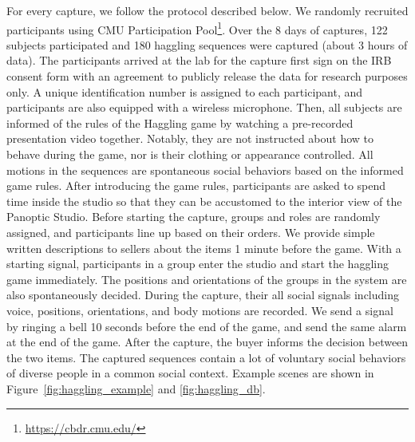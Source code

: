 For every capture, we follow the protocol described below. We randomly recruited participants using CMU Participation Pool\footnote{\url{https://cbdr.cmu.edu/}}. Over the 8 days of captures, 122 subjects participated and 180 haggling sequences were captured (about 3 hours of data). The participants arrived at the lab for the capture first sign on the IRB consent form with an agreement to publicly release the data for research purposes only. A unique identification number is assigned to each participant, and participants are also equipped with a wireless microphone.  Then, all subjects are informed of the rules of the Haggling game by watching a pre-recorded presentation video together. Notably, they are not instructed about how to behave during the game, nor is their clothing or appearance controlled. All motions in the sequences are spontaneous social behaviors based on the informed game rules. After introducing the game rules, participants are asked to spend time inside the studio so that they can be accustomed to the interior view of the Panoptic Studio. Before starting the capture, groups and roles are randomly assigned, and participants line up based on their orders. We provide simple written descriptions to sellers about the items 1 minute before the game. With a starting signal, participants in a group enter the studio and start the haggling game immediately. The positions and orientations of the groups in the system are also spontaneously decided. During the capture, their all social signals including voice, positions, orientations, and body motions are recorded.  We send a signal by ringing a bell 10 seconds before the end of the game, and send the same alarm at the end of the game. After the capture, the buyer informs the decision between the two items. The captured sequences contain a lot of voluntary social behaviors of diverse people in a common social context. Example scenes are shown in Figure~\ref{fig:haggling_example} and \ref{fig:haggling_db}.
% 
%





%




